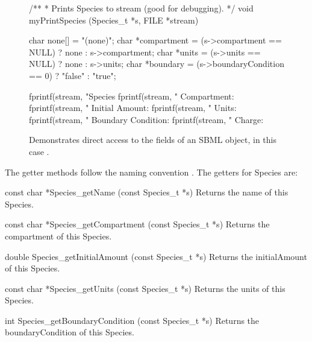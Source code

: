 \documentclass{cekmanual}
\begin{document}
\begin{figure}[htb]
  \begin{codeVerbatim}[C,flexiblecolumns=false]
/**
 * Prints Species to stream (good for debugging).
 */
void
myPrintSpecies (Species_t *s, FILE *stream)
{
  char none[]       = "(none)";
  char *compartment = (s->compartment == NULL) ? none : s->compartment;
  char *units       = (s->units       == NULL) ? none : s->units;
  char *boundary    = (s->boundaryCondition == 0) ? "false" : "true";


  fprintf(stream, "Species %
  fprintf(stream, "         Compartment: %
  fprintf(stream, "      Initial Amount: %
  fprintf(stream, "               Units: %
  fprintf(stream, "  Boundary Condition: %
  fprintf(stream, "              Charge: %
}
  \end{codeVerbatim}
  \caption{Demonstrates direct access to the fields of an SBML object,
  in this case .}
  \label{fig:print-species}
\end{figure}

The getter methods follow the naming convention
.  The getters for Species are:


\begin{methoddef}{const char *Species\_getName (const Species\_t *s)}
  Returns the name of this Species.
\end{methoddef}

\begin{methoddef}{const char *Species\_getCompartment (const Species\_t *s)}
  Returns the compartment of this Species.
\end{methoddef}

\begin{methoddef}{double Species\_getInitialAmount (const Species\_t *s)}
  Returns the initialAmount of this Species.
\end{methoddef}

\begin{methoddef}{const char *Species\_getUnits (const Species\_t *s)}
  Returns the units of this Species.
\end{methoddef}

\begin{methoddef}{int Species\_getBoundaryCondition (const Species\_t *s)}
  Returns the boundaryCondition of this Species.
\end{methoddef}
\end{document}
